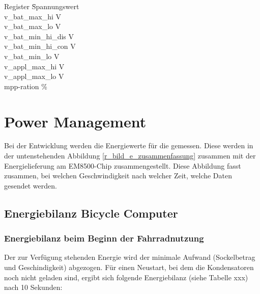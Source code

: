 \begin{minipage}{\textwidth}
    \begin{tabbing}
        Register \quad\= Spannungswert \\[0.8ex]
        v\_bat\_max\_hi        V \\
        v\_bat\_max\_lo        V \\
        v\_bat\_min\_hi\_dis   V \\
        v\_bat\_min\_hi\_con   V \\
        v\_bat\_min\_lo        V \\
        v\_appl\_max\_hi       V \\
        v\_appl\_max\_lo       V \\   
        mpp-ration            \thinspace\%
    \end{tabbing}
\end{minipage}  



\section{Power Management}

Bei der Entwicklung werden die Energiewerte für die gemessen. Diese werden in der untenstehenden Abbildung \ref{r_bild_e_zusammenfassung} zusammen mit der Energielieferung am EM8500-Chip zusammengestellt. Diese Abbildung fasst zusammen, bei welchen Geschwindigkeit nach welcher Zeit, welche Daten gesendet werden. 

\subsection{Energiebilanz Bicycle Computer}


\subsubsection{Energiebilanz beim Beginn der Fahrradnutzung}

Der zur Verfügung stehenden Energie wird der minimale Aufwand (Sockelbetrag und Geschindigkeit) abgezogen. 
Für einen Neustart, bei dem die Kondensatoren noch nicht geladen sind, ergibt sich folgende Energiebilanz (siehe Tabelle xxx) nach 10 Sekunden:

